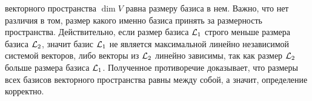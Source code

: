 	 векторного пространства $\dim V$ равна размеру базиса в нем. Важно, что нет различия в том, размер какого именно базиса принять за размерность пространства. Действительно, если размер базиса $\mathcal{L}_1$ строго меньше размера базиса $\mathcal{L}_2$, значит базис $\mathcal{L}_1$ не является максимальной линейно независимой системой векторов, либо векторы из $\mathcal{L}_2$ линейно зависимы, так как размер $\mathcal{L}_2$ больше размера базиса $\mathcal{L}_1$. Полученное противоречие доказывает, что размеры всех базисов векторного пространства равны между собой, а значит, определение корректно.